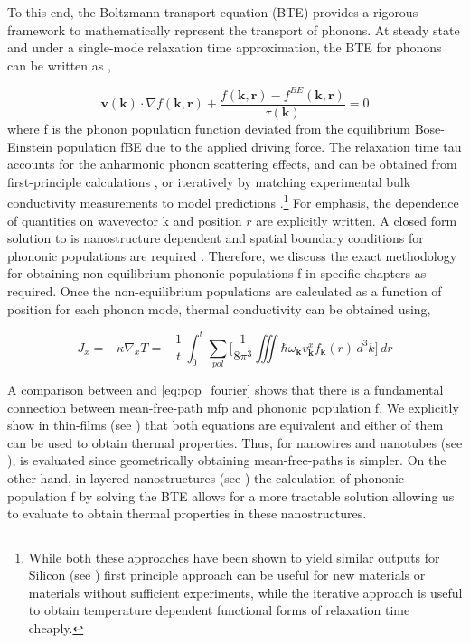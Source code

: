 To this end, the Boltzmann transport equation (BTE) provides a rigorous framework to mathematically represent the transport of phonons. At steady state and under a single-mode relaxation time approximation, the BTE for phonons can be written as \cite{book_Ziman,ownCoupling1},

\begin{equation}
\mathbf{v}(\mathbf{k}) \cdot \nabla f(\mathbf{k},\mathbf{r})  + \frac{f(\mathbf{k},\mathbf{r})-f^{BE}(\mathbf{k},\mathbf{r})}{\tau(\mathbf{k})}=0
\label{eq:bte_ss}
\end{equation} 				
where \gls{f} is the phonon population function deviated from the equilibrium Bose-Einstein population \gls{fBE} due to the applied driving force. The relaxation time \gls{tau} accounts for the anharmonic phonon scattering effects, and can be obtained from first-principle calculations \cite{stokes_bulkSi_tau,bAs_broido}, or iteratively by matching experimental bulk conductivity measurements to model predictions \cite{aksamijaNW,maldovan2011tf}.\footnote{While both these approaches have been shown to yield similar outputs for Silicon (see ) first principle approach can be useful for new materials or materials without sufficient experiments, while the iterative approach is useful to  obtain temperature dependent functional forms of relaxation time cheaply.} For emphasis, the dependence of quantities on wavevector \gls{k} and position $r$ are explicitly written. A closed form solution to  is nanostructure dependent and spatial boundary conditions for phononic populations are required \cite{ownKK1,ownCoupling1,ownCoupling2,RN396} . Therefore, we discuss the exact methodology for obtaining non-equilibrium phononic populations \gls{f} in specific chapters as required. Once the non-equilibrium populations are calculated as a function of position for each phonon mode, thermal conductivity can be obtained using,

\begin{equation}
J_x=-\kappa \nabla_x T = -\frac{1}{t}\,{\int_{0}^{t} \sum_{pol} \Big[ \frac{1}{8 \pi^3}\iiint \hbar\omega_{\mathbf{k}}v^x_{\mathbf{k}}f_{\mathbf{k}}({r}) \,d^3{k} \Big]} \,d{r}
\label{eq:pop_fourier}
\end{equation} 

	A comparison between  and \eqref{eq:pop_fourier} shows that there is a fundamental connection between mean-free-path \gls{mfp} and phononic population \gls{f}. We explicitly show in thin-films (see ) that both equations are equivalent and either of them can be used to obtain thermal properties. Thus, for nanowires and nanotubes (see ),  is evaluated since geometrically obtaining mean-free-paths is simpler. On the other hand, in layered nanostructures (see ) the calculation of phononic population \gls{f} by solving the BTE allows for a more tractable solution allowing us to evaluate  to obtain thermal properties in these nanostructures.
	
